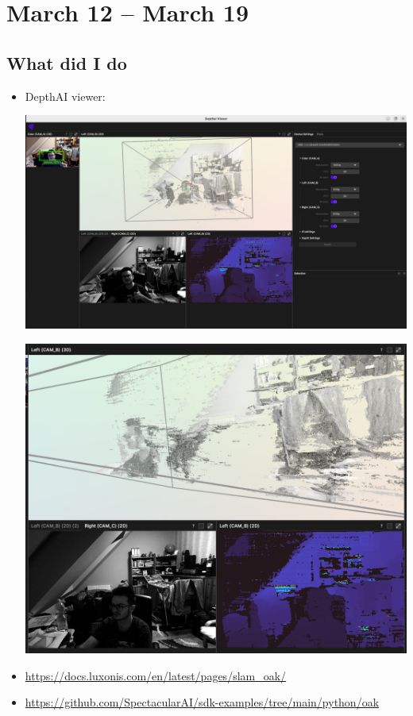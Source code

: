 \documentclass{article}
\begin{document}
\newpage

\section{March 12 -- March 19}

\subsection{What did I do}
\begin{itemize}
    \item DepthAI viewer:\par
    \begin{minipage}{\linewidth}
        \centering
        \includegraphics[width=1\linewidth]{depthai_viewer.png}
    \end{minipage}
    \begin{minipage}{\linewidth}
        \centering
        \includegraphics[width=1\linewidth]{depthai_viewer_3d.png}
    \end{minipage}
    \item \url{https://docs.luxonis.com/en/latest/pages/slam_oak/}
    \item \url{https://github.com/SpectacularAI/sdk-examples/tree/main/python/oak}
        
\end{itemize}
\end{document}
